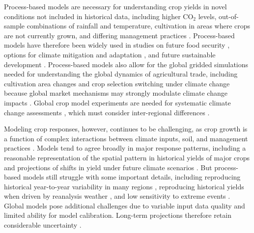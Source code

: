 \documentclass[gmd, manuscript]{copernicus} %
\begin{document}
Process-based models are necessary for understanding crop yields in novel conditions not included in historical data, including higher CO$_2$ levels, out-of-sample combinations of rainfall and temperature, cultivation in areas where crops are not currently grown, and differing management practices \citep[e.g.][]{pugh_climate_2016, Roberts2017,minoli2019modelling}. Process-based models have therefore been widely used in studies on future food security \citep{wheeler2013climate, Elliott14, frieler2017assessing}, options for climate mitigation \citep{muller2015} and adaptation \citep{challinor2018improving}, and future sustainable development \citep{humpenoder2018large, jagermeyr_reconciling_2017}.
Process-based models also allow for the global gridded simulations needed for understanding the global dynamics of agricultural trade, including cultivation area changes and crop selection switching under climate change \citep{rosenzweig2018,ruane2018} because global market mechanisms may strongly modulate climate change impacts \citep{Stevanovic2016,hasegawa2018risk}. 
Global crop model experiments are needed for systematic climate change assessments \citep{muller_global_2017}, which must consider inter-regional differences \citep[e.g.][]{Nelson2014, Wiebe_2015}.

Modeling crop responses, however, continues to be challenging, as crop growth is a function of complex interactions between climate inputs, soil, and management practices \citep{Boote13,rotter2011}. 
Models tend to agree broadly in major response patterns, including a reasonable representation of the spatial pattern in historical yields of major crops and projections of shifts in yield under future climate scenarios \citep[e.g.][]{Elliott2015, muller_global_2017}. 
But process-based models still struggle with some important details, including reproducing historical year-to-year variability in many regions \citep[e.g.][]{muller_global_2017, Jag2018}, reproducing historical yields when driven by reanalysis weather \citep[e.g.][]{Glotter14}, and low sensitivity to extreme events \citep[e.g.][]{Glotter15,schewe2019}. 
Global models pose additional challenges due to variable input data quality and limited ability for model calibration.
Long-term projections therefore retain considerable uncertainty \citep{WOLF2002217, JAGTAP200273, Iizumi2010, ANGULO201332, Asseng2013, Asseng2015}. 
\end{document}
